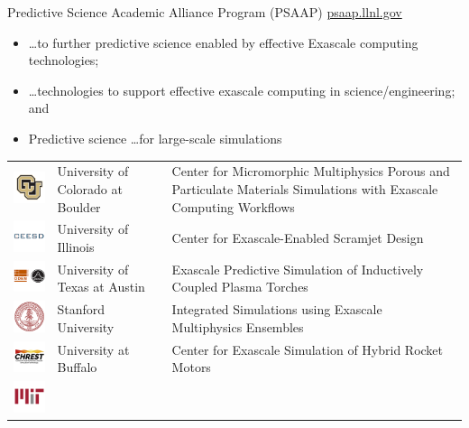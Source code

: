 \documentclass[aspectratio=169]{beamer}
\begin{document}
\begin{frame}{Predictive Science Academic Alliance Program (PSAAP)}
\url{psaap.llnl.gov}
      \begin{itemize}
        \item \ldots to further predictive science enabled by effective Exascale computing technologies;
        \item \ldots technologies to support effective exascale computing in science/engineering; and
        \item Predictive science \ldots for large-scale simulations
      \end{itemize}
  \begin{center}
    \tiny
    \begin{tabular}{m{1cm}m{4cm}m{8cm}}
      \includegraphics[width=.5cm]{./figures/logo_cu.png}&
      University of Colorado at Boulder& Center for Micromorphic Multiphysics Porous and Particulate Materials Simulations with Exascale Computing Workflows\\
      \includegraphics[width=.5cm]{./figures/logo_ceesd.png}&
      University of Illinois& Center for Exascale-Enabled Scramjet Design\\
      \includegraphics[width=.5cm]{./figures/logo_ut.png}&
      University of Texas at Austin& Exascale Predictive Simulation of Inductively Coupled Plasma Torches\\
      \includegraphics[width=.5cm]{./figures/logo_stanford.png}&
      Stanford University& Integrated Simulations using Exascale Multiphysics Ensembles\\
      \includegraphics[width=.5cm]{./figures/logo_buffalo.png}&
      University at Buffalo& Center for Exascale Simulation of Hybrid Rocket Motors\\
      \includegraphics[width=.5cm]{./figures/logo_mit.png}&

\end{tabular}
\end{center}
\end{frame}
\end{document}
